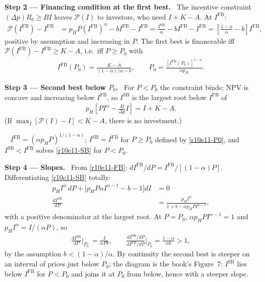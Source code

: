 \documentclass[11pt,a4paper]{article}
\newcommand{\step}[2]{\par\medskip\noindent\textbf{Step #1 --- #2.}~}
\newcommand{\answer}[1]{\par\smallskip\noindent\fbox{\textbf{Answer\if\relax\detokenize{#1}\relax\else\ #1\fi.}}~}
\newcommand{\Pc}{\mathcal{P}}
\begin{document}
\step{2}{Financing condition at the first best} The incentive constraint $(\Delta p)R_b\geq BI$ leaves $\Pc(I)$ to investors, who need $I+K-A$. At $I^{\text{FB}}$:
\begin{align}
  \Pc(I^{\text{FB}})-I^{\text{FB}} &= p_HP(I^{\text{FB}})^\alpha-bI^{\text{FB}}-I^{\text{FB}} = \frac{I^{\text{FB}}}{\alpha}-bI^{\text{FB}}-I^{\text{FB}} = \left[\frac{1-\alpha}{\alpha}-b\right]I^{\text{FB}}, \label{r10e11-gap}
\end{align}
positive by assumption and increasing in $P$. The first best is financeable iff $\Pc(I^{\text{FB}})-I^{\text{FB}}\geq K-A$, i.e.\ iff $P\geq P_0$ with
\begin{align}
  I^{\text{FB}}(P_0) = \frac{K-A}{(1-\alpha)/\alpha-b}, \qquad P_0=\frac{[I^{\text{FB}}(P_0)]^{1-\alpha}}{\alpha p_H}. \label{r10e11-P0}
\end{align}

\step{3}{Second best below $P_0$} For $P<P_0$ the constraint binds; NPV is concave and increasing below $I^{\text{FB}}$, so $I^{\text{SB}}$ is the largest root below $I^{\text{FB}}$ of
\begin{align}
  p_H\left[PI^\alpha-\frac{B}{\Delta p}I\right] = I+K-A. \label{r10e11-SB}
\end{align}
(If $\max_I[\Pc(I)-I]<K-A$, there is no investment.)

\answer{(i)} $I^{\text{FB}}=(\alpha p_HP)^{1/(1-\alpha)}$; $I^{\text{SB}}=I^{\text{FB}}$ for $P\geq P_0$ defined by \eqref{r10e11-P0}, and $I^{\text{SB}}<I^{\text{FB}}$ solves \eqref{r10e11-SB} for $P<P_0$.

\step{4}{Slopes} From \eqref{r10e11-FB}: $dI^{\text{FB}}/dP=I^{\text{FB}}/[(1-\alpha)P]$. Differentiating \eqref{r10e11-SB} totally:
\begin{align}
  p_HI^\alpha\,dP+\bigl[p_HP\alpha I^{\alpha-1}-b-1\bigr]dI &= 0 \nonumber\\
  \frac{dI^{\text{SB}}}{dP} &= \frac{p_HI^\alpha}{1+b-\alpha p_HPI^{\alpha-1}}, \label{r10e11-dSB}
\end{align}
with a positive denominator at the largest root. At $P=P_0$, $\alpha p_HPI^{\alpha-1}=1$ and $p_HI^\alpha=I/(\alpha P)$, so
\begin{align}
  \frac{dI^{\text{SB}}}{dP}\Big|_{P_0^-} = \frac{I}{\alpha Pb}, \qquad \frac{dI^{\text{SB}}/dP}{dI^{\text{FB}}/dP}\Big|_{P_0} = \frac{1-\alpha}{\alpha b}>1, \label{r10e11-ratio}
\end{align}
by the assumption $b<(1-\alpha)/\alpha$. By continuity the second best is steeper on an interval of prices just below $P_0$; the diagram is the book's Figure~7: $I^{\text{SB}}$ lies below $I^{\text{FB}}$ for $P<P_0$ and joins it at $P_0$ from below, hence with a steeper slope.
\end{document}
